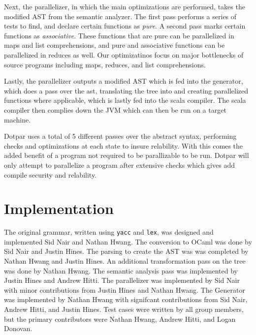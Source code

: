 Next, the parallelizer, in which the main optimizations are performed, takes
the modified AST from the semantic analyzer. The first pass
performs a series of tests to find, and declare certain functions as
\emph{pure}. A second pass marks certain functions as \emph{associative}.
These functions that are pure can be parallelized in maps and list
comprehensions, and pure and associative functions can be parallelized in
reduces as well. Our optimizatinos focus on major bottlenecks of source programs
including maps, reduces, and list comprehensions.

Lastly, the parallelizer outputs a modified AST which is fed into the generator, 
which does a pass over the ast, translating the tree into and creating parallelized 
functions where applicable, which is lastly fed into the scala compiler.  The
scala compiler then complies down the JVM which can then be run on a target machine.

Dotpar uses a total of 5 different passes over the abstract syntax, performing 
checks and optimizations at each state to insure relability.  With this comes
the added benefit of a program not required to be parallizable to be run.  Dotpar
will only attempt to parallelize a program after extensive checks which gives add 
compile security and relability.

\section{Implementation}
The original grammar, written using \verb=yacc= and \verb=lex=, was designed and
implemented Sid Nair and Nathan Hwang. The conversion to OCaml was done by Sid
Nair and Justin Hines. The parsing to create the AST was was completed by
Nathan Hwang and Justin Hines. An additional transformation pass on the tree was
done by Nathan Hwang. The semantic analysis pass was implemented by Justin
Hines and Andrew Hitti. The parallelizer was implemented by Sid Nair with minor
contributions from Justin Hines and Nathan Hwang. The Generator was implemented
by Nathan Hwang with signifcant contributions from Sid Nair, Andrew Hitti, and
Justin Hines. Test cases were written by all group members, but the primary
contributors were Nathan Hwang, Andrew Hitti, and Logan Donovan.
